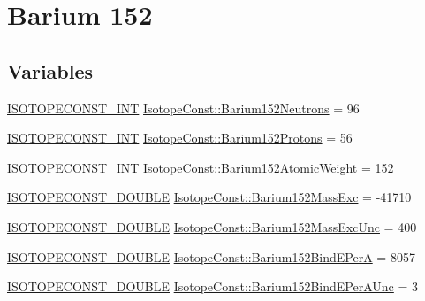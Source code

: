 \hypertarget{group___isotope_const-_barium-_ba152}{}\section{Barium 152}
\label{group___isotope_const-_barium-_ba152}
\subsection*{Variables}
\begin{DoxyCompactItemize}
\item 
\mbox{\hyperlink{group___isotope_const-_macros_ga5f18360b3e99483a35c32d789e62621c}{I\+S\+O\+T\+O\+P\+E\+C\+O\+N\+S\+T\+\_\+\+I\+NT}} \mbox{\hyperlink{group___isotope_const-_barium-_ba152_ga29b704f28b977ee8578851160d29a26b}{Isotope\+Const\+::\+Barium152\+Neutrons}} = 96
\item 
\mbox{\hyperlink{group___isotope_const-_macros_ga5f18360b3e99483a35c32d789e62621c}{I\+S\+O\+T\+O\+P\+E\+C\+O\+N\+S\+T\+\_\+\+I\+NT}} \mbox{\hyperlink{group___isotope_const-_barium-_ba152_ga06eb64f511366f4ce995daf4fd34a845}{Isotope\+Const\+::\+Barium152\+Protons}} = 56
\item 
\mbox{\hyperlink{group___isotope_const-_macros_ga5f18360b3e99483a35c32d789e62621c}{I\+S\+O\+T\+O\+P\+E\+C\+O\+N\+S\+T\+\_\+\+I\+NT}} \mbox{\hyperlink{group___isotope_const-_barium-_ba152_ga3ea3acdf7144cf571776cf14c00fd959}{Isotope\+Const\+::\+Barium152\+Atomic\+Weight}} = 152
\item 
\mbox{\hyperlink{group___isotope_const-_macros_ga8f45a7272ce02c0b4c65c44636ed719a}{I\+S\+O\+T\+O\+P\+E\+C\+O\+N\+S\+T\+\_\+\+D\+O\+U\+B\+LE}} \mbox{\hyperlink{group___isotope_const-_barium-_ba152_ga429d98b2ddb423c65c06ad281e46c7c0}{Isotope\+Const\+::\+Barium152\+Mass\+Exc}} = -\/41710
\item 
\mbox{\hyperlink{group___isotope_const-_macros_ga8f45a7272ce02c0b4c65c44636ed719a}{I\+S\+O\+T\+O\+P\+E\+C\+O\+N\+S\+T\+\_\+\+D\+O\+U\+B\+LE}} \mbox{\hyperlink{group___isotope_const-_barium-_ba152_gab373bbb4f7f51b8b1563c412f63b3a2c}{Isotope\+Const\+::\+Barium152\+Mass\+Exc\+Unc}} = 400
\item 
\mbox{\hyperlink{group___isotope_const-_macros_ga8f45a7272ce02c0b4c65c44636ed719a}{I\+S\+O\+T\+O\+P\+E\+C\+O\+N\+S\+T\+\_\+\+D\+O\+U\+B\+LE}} \mbox{\hyperlink{group___isotope_const-_barium-_ba152_gae64acce340990a4b0d5827e6952ffe04}{Isotope\+Const\+::\+Barium152\+Bind\+E\+PerA}} = 8057
\item 
\mbox{\hyperlink{group___isotope_const-_macros_ga8f45a7272ce02c0b4c65c44636ed719a}{I\+S\+O\+T\+O\+P\+E\+C\+O\+N\+S\+T\+\_\+\+D\+O\+U\+B\+LE}} \mbox{\hyperlink{group___isotope_const-_barium-_ba152_gae3cd486632f565a600d61fb32197a68f}{Isotope\+Const\+::\+Barium152\+Bind\+E\+Per\+A\+Unc}} = 3

\end{DoxyCompactItemize}
